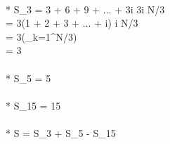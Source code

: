 \\* S_{3} = 3 + 6 + 9 + ... + 3i \hspace{10ex} 3i \leq N/3 \\[1ex]
\phantom{x} \hspace{1ex} = 3(1 + 2 + 3 + ... + i) \hspace{9ex} i \leq N/3 \\[1ex]
\phantom{x} \hspace{1ex} = 3(\sum_{k=1}^{N/3}) \\[1ex]
\phantom{x} \hspace{1ex} = 3 \\[3ex]

\\* S_{5} = 5 \\[3ex]

\\* S_{15} = 15 \\[3ex]

\\* S = S_{3} + S_{5} - S_{15}